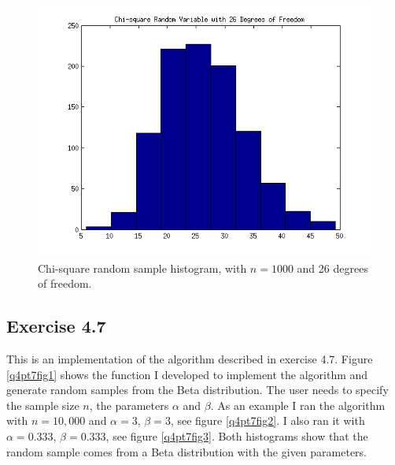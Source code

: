 \documentclass[12pt,a4paper]{article}
\begin{document}
\begin{figure}[ht!]
\begin{center}
\includegraphics[scale=.80]{q4pt6_hist.png}
\caption{Chi-square random sample histogram, with $n=1000$ and 26 degrees of freedom.}
\label{q4pt6fig2}
\end{center}
\end{figure}
\FloatBarrier

\subsection*{Exercise 4.7}

This is an implementation of the algorithm described in exercise 4.7. Figure \ref{q4pt7fig1} shows the function I developed to implement the algorithm and generate random samples from the Beta distribution. The user needs to specify the sample size $n$, the parameters $\alpha$ and $\beta$. As an example I ran the algorithm with $n=10,000$ and $\alpha=3$, $\beta=3$, see figure \ref{q4pt7fig2}. I also ran it with $\alpha=0.333$, $\beta=0.333$, see figure \ref{q4pt7fig3}. Both histograms show that the random sample comes from a Beta distribution with the given parameters.
\end{document}
